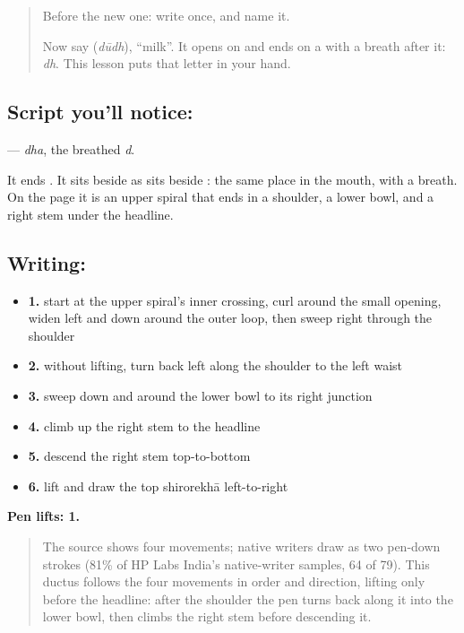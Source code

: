 \begin{quote}
Before the new one: write \textbf{} once, and name it.

Now say \textbf{} (\emph{dūdh}), \textquotedblleft{}milk\textquotedblright{}. It opens on \textbf{} and ends on a \textbf{} with a breath after it: \emph{dh}. This lesson puts that letter in your hand.
\end{quote}

\subsection*{Script you'll notice: }
\textbf{} — \emph{dha}, the breathed \emph{d}.

It ends \textbf{}. It sits beside \textbf{} as \textbf{} sits beside \textbf{}: the same place in the mouth, with a breath. On the page it is an upper spiral that ends in a shoulder, a lower bowl, and a right stem under the headline.

\subsection*{Writing: }

\begin{itemize}
\raggedright
  \item \textbf{1.} start at the upper spiral's inner crossing, curl around the small opening, widen left and down around the outer loop, then sweep right through the shoulder
  \item \textbf{2.} without lifting, turn back left along the shoulder to the left waist
  \item \textbf{3.} sweep down and around the lower bowl to its right junction
  \item \textbf{4.} climb up the right stem to the headline
  \item \textbf{5.} descend the right stem top-to-bottom
  \item \textbf{6.} lift and draw the top shirorekhā left-to-right
\end{itemize}

\textbf{Pen lifts: 1.}

\begin{quote}
The source shows four movements; native writers draw  as two pen-down strokes (81\% of HP Labs India's native-writer samples, 64 of 79). This ductus follows the four movements in order and direction, lifting only before the headline: after the shoulder the pen turns back along it into the lower bowl, then climbs the right stem before descending it.
\end{quote}

